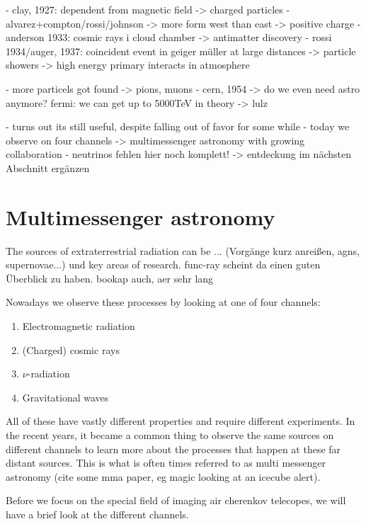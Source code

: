 - clay, 1927: dependent from magnetic field -> charged particles
- alvarez+compton/rossi/johnson -> more form west than east -> positive charge
- anderson 1933: cosmic rays i cloud chamber -> antimatter discovery
- rossi 1934/auger, 1937: coincident event in geiger müller at large distances -> particle showers -> high energy primary interacts in atmosphere

- more particels got found -> pions, muons
- cern, 1954 -> do we even need astro anymore? fermi: we can get up to 5000TeV in theory -> lulz


- turns out its still useful, despite falling out of favor for some while
- today we observe on four channels -> multimessenger astronomy with growing collaboration
- neutrinos fehlen hier noch komplett! -> entdeckung im nächsten Abschnitt ergänzen

\section{Multimessenger astronomy}

The sources of extraterrestrial radiation can be ...
(Vorgänge kurz anreißen, agns, supernovae...)
und key areas of research. func-ray scheint da einen guten Überblick zu haben. bookap auch, aer sehr lang


Nowadays we observe these processes by looking at one of four channels: 
\begin{enumerate}
	\item Electromagnetic radiation
	\item (Charged) cosmic rays
	\item $\nu$-radiation
	\item Gravitational waves
\end{enumerate}

All of these have vastly different properties and require different experiments.
In the recent years, it became a common thing to observe the same sources 
on different channels to learn more about the processes that happen at 
these far distant sources. This is what is often times 
referred to as multi messenger astronomy (cite some mma paper, eg magic looking at an icecube alert).

Before we focus on the special field of imaging air cherenkov telecopes, we will have
a brief look at the different channels.

